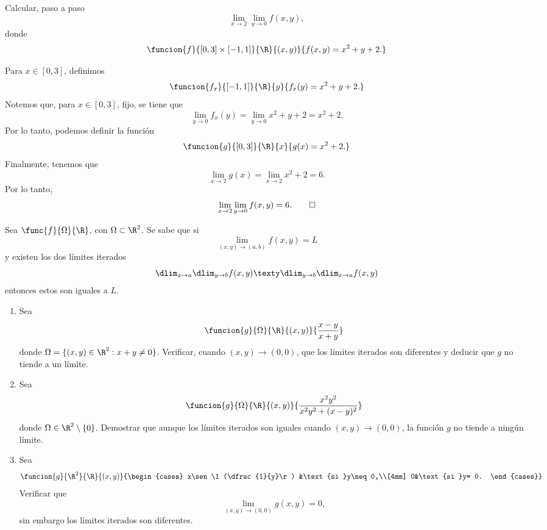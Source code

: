 \documentclass[a4,11pt]{aleph-examen}
\begin{document}
\begin{preguntas}
\begin{respuesta}
\item 
    Calcular, paso a paso
    \[
        \lim_{x\to 2}\lim_{y\to 0}f(x,y),
    \]
    donde
    \[
        \funcion{f}{[0,3]\times[-1,1]}{\R}
        {(x,y)}{f(x,y)=x^2+y+2.}
    \]
    
\begin{respuesta}
    Para $x\in [0,3]$, definimos
    \[
        \funcion{f_x}{[-1,1]}{\R}{y}{f_x(y)=x^2+y+2.}
    \]
    Notemos que, para $x\in[0,3]$, fijo, se tiene que
    \[
        \lim_{y\to 0}f_x(y)=\lim_{y\to 0}x^2+y+2=x^2+2.
    \]
    Por lo tanto, podemos definir la función
    \[
        \funcion{g}{[0,3]}{\R}{x}{g(x)=x^2+2.}
    \]
    Finalmente, tenemos que
    \[
        \lim_{x\to 2}g(x)=\lim_{x\to 2}x^2+2=6.
    \]
    Por lo tanto,
    \[
        \lim_{x\to 2}\lim_{y\to 0}f(x,y) = 6.\qedhere
    \]
\end{respuesta}

\item
    Sea $\func{f}{\Omega}{\R}$, con $\Omega \subset \R^2$. Se sabe que si 
    \[
        \lim_{(x,y)\to(a,b)}f(x,y)=L
    \]
    y existen los dos límites iterados 
    \[
              \dlim_{x\to a}\dlim_{y\to b}f(x,y) \texty \dlim_{y\to b}\dlim_{x\to a}f(x,y)
    \]
    entonces estos son iguales a $L$. 
    \begin{enumerate}
        \item Sea
            \[
                \funcion{g}{\Omega}{\R}{(x,y)}{\frac{x-y}{x+y}}
            \]
            donde $\Omega=\lbrace (x,y)\in \R^2:x+y\neq 0 \rbrace $. Verificar, cuando $(x,y)\to (0,0)$, que los límites iterados son diferentes y deducir que $g$ no tiende a un límite.
        \item Sea
            \[
                \funcion{g}{\Omega}{\R}{(x,y)}{\frac{x^2y^2}{x^2y^2+(x-y)^2}}
            \]
            donde $\Omega \in \R^2 \setminus \lbrace 0 \rbrace$. Demostrar que aunque los límites iterados son iguales cuando $(x,y)\to (0,0)$, la función $g$ no tiende a ningún límite.
        \item Sea
            \[
                \funcion{g}{\R^2}{\R}{(x,y)}
                    {\begin{cases}                    
                    x\sen\l(\dfrac{1}{y}\r) &\text{si }y\neq 0,\\[4mm]
                    0&\text{si }y= 0.
                \end{cases}}
            \]
            Verificar que 
            \[
                \lim_{(x,y)\to (0,0)}g(x,y)=0,
            \]
            sin embargo los límites iterados son diferentes.
    \end{enumerate}


\end{respuesta}
\end{preguntas}
\end{document}
